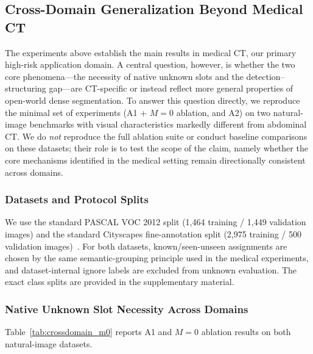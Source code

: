 \documentclass[journal]{IEEEtai}
\begin{document}
\subsection{Cross-Domain Generalization Beyond Medical CT}\label{sec:exp:crossdomain}

The experiments above establish the main results in medical CT, our primary
high-risk application domain. A central question, however, is whether the two core
phenomena---the necessity of native unknown slots and the detection--structuring
gap---are CT-specific or instead reflect more general properties of open-world dense
segmentation. To answer this question directly, we reproduce the minimal set of
experiments (A1 + $M{=}0$ ablation, and A2) on two natural-image benchmarks with
visual characteristics markedly different from abdominal CT. We do \emph{not}
reproduce the full ablation suite or conduct baseline comparisons on these datasets;
their role is to test the scope of the claim, namely whether the core mechanisms
identified in the medical setting remain directionally consistent across domains.

\subsubsection{Datasets and Protocol Splits}\label{sec:exp:crossdomain:data}

We use the standard PASCAL VOC 2012 split (1,464 training / 1,449 validation images)
and the standard Cityscapes fine-annotation split (2,975 training / 500 validation
images)~\cite{everingham2010pascal,cordts2016cityscapes}.
For both datasets, known/seen-unseen assignments are chosen by the same
semantic-grouping principle used in the medical experiments, and dataset-internal
ignore labels are excluded from unknown evaluation.
The exact class splits are provided in the supplementary material.

\subsubsection{Native Unknown Slot Necessity Across Domains}\label{sec:exp:crossdomain:m0}

Table~\ref{tab:crossdomain_m0} reports A1 and $M{=}0$ ablation results on both
natural-image datasets.
\end{document}
